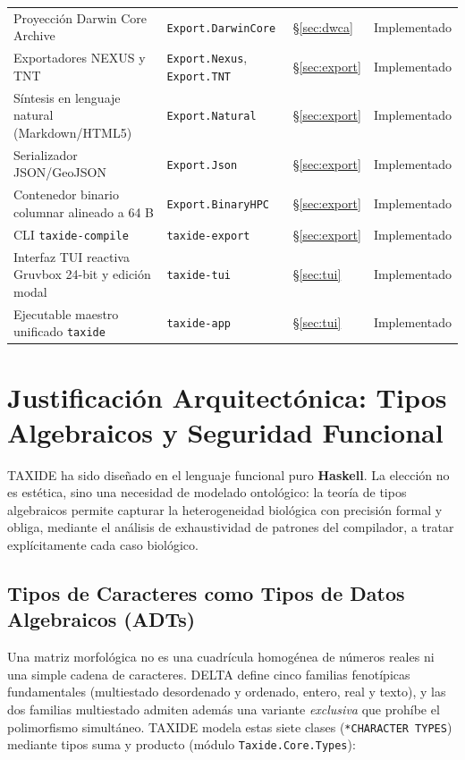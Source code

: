 \documentclass[11pt,a4paper]{article}
\theoremstyle{definition}
\theoremstyle{remark}
\begin{document}
\begin{table}[ht]
\begin{tabularx}{\textwidth}{@{}X l l l@{}}
Proyección Darwin Core Archive & \texttt{Export.DarwinCore} & \S\ref{sec:dwca} & Implementado \\
Exportadores NEXUS y TNT & \texttt{Export.Nexus}, \texttt{Export.TNT} & \S\ref{sec:export} & Implementado \\
Síntesis en lenguaje natural (Markdown/HTML5) & \texttt{Export.Natural} & \S\ref{sec:export} & Implementado \\
Serializador JSON/GeoJSON & \texttt{Export.Json} & \S\ref{sec:export} & Implementado \\
Contenedor binario columnar alineado a 64 B & \texttt{Export.BinaryHPC} & \S\ref{sec:export} & Implementado \\
CLI \texttt{taxide-compile} & \texttt{taxide-export} & \S\ref{sec:export} & Implementado \\
Interfaz TUI reactiva Gruvbox 24-bit y edición modal & \texttt{taxide-tui} & \S\ref{sec:tui} & Implementado \\
Ejecutable maestro unificado \texttt{taxide} & \texttt{taxide-app} & \S\ref{sec:tui} & Implementado \\
\bottomrule
\end{tabularx}
\end{table}

\section{Justificación Arquitectónica: Tipos Algebraicos y Seguridad Funcional}

TAXIDE ha sido diseñado en el lenguaje funcional puro \textbf{Haskell}. La elección no es estética, sino una necesidad de modelado ontológico: la teoría de tipos algebraicos permite capturar la heterogeneidad biológica con precisión formal y obliga, mediante el análisis de exhaustividad de patrones del compilador, a tratar explícitamente cada caso biológico.

\subsection{Tipos de Caracteres como Tipos de Datos Algebraicos (ADTs)}
\label{sec:adts}
Una matriz morfológica no es una cuadrícula homogénea de números reales ni una simple cadena de caracteres. DELTA define cinco familias fenotípicas fundamentales (multiestado desordenado y ordenado, entero, real y texto), y las dos familias multiestado admiten además una variante \emph{exclusiva} que prohíbe el polimorfismo simultáneo. TAXIDE modela estas siete clases (\texttt{*CHARACTER TYPES}) mediante tipos suma y producto (módulo \texttt{Taxide.Core.Types}):
\end{document}

